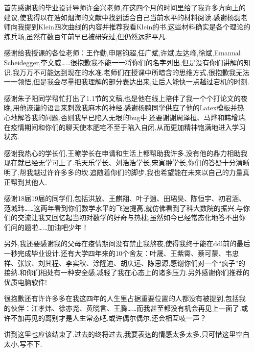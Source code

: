 
\begin{thanks}
	
	首先感谢我的毕业设计导师许金兴老师,在这四个月的时间里给了我许多方向上的建议,使我得以在浩如烟海的文献中找到适合自己当前水平的材料阅读.感谢杨磊老师向我提到Klein四次曲线的内容并推荐我看Klein的书,这些材料确实是各个理论的练兵场,虽然在数百年前早已被研究过,但仍然远非平凡.
	
	感谢给我授课的各位老师：王作勤,申屠钧超,任广斌,许斌,左达峰,徐斌,Emanual Scheidegger,李文威……很抱歉我不能一一将你们的名字列出,但是没有你们讲解的知识,我万万不可能达到现在的水准.老师们在授课中所暗含的思维方式,很抱歉我无法一一领悟,但是我会尽量把我理解的部分表达出来,让后人能快一点越过宕机的时刻.
	
	感谢朱子阳同学帮忙打出了1.1节的文稿,也是他在线上陪伴了我一个个打论文的夜晚,用他诙谐的语言来刺激我麻木的神经.感谢杨鹏同学供应了他的Latex模板并热心地解答我的问题,否则我早已陷入无垠的bug中.还要谢谢周泽桓、马烨和韩增瑞,在疫情期间和你们的聊天使本肥宅不至于陷入自闭,从而更加精神饱满地进入学习状态.
	
	感谢我热心的学长们,王瞭学长在申请和生活上都帮助我许多,没有他的鼎力相助我现在就已经无学可上了.毛天乐学长、刘浩浩学长,宋寅翀学长,你们的答疑十分清晰明了,帮我越过许许多多的坎.追随着你们的脚步,我也希望能在未来以自己的力量真正帮到其他人.%
	
	感谢18届19届的同学们,包括洪放、王麒翔、叶子逍、田珺昊、陈恒宇、初君涵、范城玮……这两年看到你们数学水平的飞速提高,就仿佛看到了科大数院的振兴.与你们的交流让我又回忆起当初对数学的好奇与热枕,虽然如今已经常态化地答不出你们问的题啦……加油吧少年！

另外,我还要感谢我的父母在疫情期间没有禁止我熬夜,使得我终于能在ddl前的最后一秒完成毕业设计.还有大学四年来的10个舍友：叶晟、王紫霄、蔡可蒙、韦忠祥、张镔、刘其程、李实秋、涂隆迪、胡庆远、陈思源,感谢你们对一个“疯子”的接纳.和你们相处有一种安全感,减轻了我在心态上的诸多压力.另外感谢你们推荐的优质电脑软件!

很抱歉还有许许多多在我这四年的人生里占据重要位置的人都没有被提到,包括我的伙伴：江孝炜、徐亦尧、黄晓言、王腾……而我甚至都没有机会再见上一面了.或许不加再见的离别才是人生常态吧,或许偶尔偶尔,还会相互吱一声？

讲到这里也应该结束了.过去的终将过去,我要表达的情感太多太多,只可惜这里空白太小,写不下.
%
%
%
%
%
%
%


\end{thanks}
